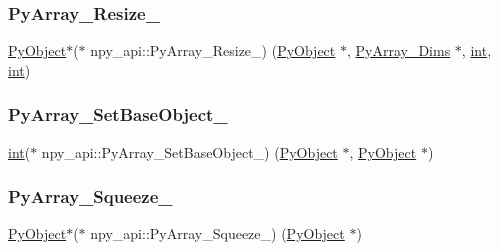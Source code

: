 \mbox{\label{structnpy__api_ab6563aca51f43ea38b4b7569e780b23d}} 
\subsubsection{\texorpdfstring{PyArray\_Resize\_}{PyArray\_Resize\_}}
{\footnotesize\ttfamily \mbox{\hyperlink{_python27_2object_8h_aadc84ac7aed2cfa6f20c25f62bf3dac7}{Py\+Object}}$\ast$($\ast$ npy\+\_\+api\+::\+Py\+Array\+\_\+\+Resize\+\_\+) (\mbox{\hyperlink{_python27_2object_8h_aadc84ac7aed2cfa6f20c25f62bf3dac7}{Py\+Object}} $\ast$, \mbox{\hyperlink{structnpy__api_1_1_py_array___dims}{Py\+Array\+\_\+\+Dims}} $\ast$, \mbox{\hyperlink{warnings_8h_a74f207b5aa4ba51c3a2ad59b219a423b}{int}}, \mbox{\hyperlink{warnings_8h_a74f207b5aa4ba51c3a2ad59b219a423b}{int}})}

\mbox{\label{structnpy__api_a7dd4d69b7cafe7f2faf6bdec7c7a6ef9}} 
\subsubsection{\texorpdfstring{PyArray\_SetBaseObject\_}{PyArray\_SetBaseObject\_}}
{\footnotesize\ttfamily \mbox{\hyperlink{warnings_8h_a74f207b5aa4ba51c3a2ad59b219a423b}{int}}($\ast$ npy\+\_\+api\+::\+Py\+Array\+\_\+\+Set\+Base\+Object\+\_\+) (\mbox{\hyperlink{_python27_2object_8h_aadc84ac7aed2cfa6f20c25f62bf3dac7}{Py\+Object}} $\ast$, \mbox{\hyperlink{_python27_2object_8h_aadc84ac7aed2cfa6f20c25f62bf3dac7}{Py\+Object}} $\ast$)}

\mbox{\label{structnpy__api_a5eaf02a66cf52e1e88bf7d2d133580af}} 
\subsubsection{\texorpdfstring{PyArray\_Squeeze\_}{PyArray\_Squeeze\_}}
{\footnotesize\ttfamily \mbox{\hyperlink{_python27_2object_8h_aadc84ac7aed2cfa6f20c25f62bf3dac7}{Py\+Object}}$\ast$($\ast$ npy\+\_\+api\+::\+Py\+Array\+\_\+\+Squeeze\+\_\+) (\mbox{\hyperlink{_python27_2object_8h_aadc84ac7aed2cfa6f20c25f62bf3dac7}{Py\+Object}} $\ast$)}

